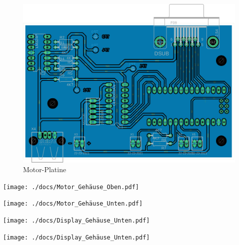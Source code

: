 \documentclass[11pt, titlepage, fleqn]{report}
\begin{document}
			\begin{figure}[!htbp]
				\centering
				\includegraphics[height=0.9\linewidth ,angle=90]{./docs/Motor_LayoutW.pdf}
				\caption{Motor-Platine}
			\end{figure}
		\newpage
		\addtocounter{section}{1}
		\label{sec:TechDraws}
			\begin{landscape}
				\texttt{[image: ./docs/Motor\_Gehäuse\_Oben.pdf]}
			\end{landscape}
			\begin{landscape}
				\texttt{[image: ./docs/Motor\_Gehäuse\_Unten.pdf]}
			\end{landscape}
			\begin{landscape}
				\texttt{[image: ./docs/Display\_Gehäuse\_Unten.pdf]}
			\end{landscape}
			\begin{landscape}
				\texttt{[image: ./docs/Display\_Gehäuse\_Unten.pdf]}
			\end{landscape}
\end{document}
